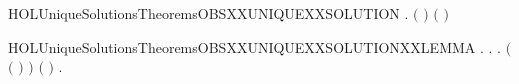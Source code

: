 \newcommand{\HOLUniqueSolutionsTheoremsOBSXXunfoldingXXlemmaFour}{\UseVerbatim{HOLUniqueSolutionsTheoremsOBSXXunfoldingXXlemmaFour}}
\begin{SaveVerbatim}{HOLUniqueSolutionsTheoremsOBSXXUNIQUEXXSOLUTION}
\HOLTokenTurnstile{} \HOLSymConst{\HOLTokenForall{}}  .
         \HOLSymConst{\HOLTokenConj{}}   \HOLSymConst{\HOLTokenConj{}}   \ensuremath{(} \ensuremath{)} \HOLSymConst{\HOLTokenConj{}}   \ensuremath{(} \ensuremath{)} \HOLSymConst{\HOLTokenImp{}}
         
\end{SaveVerbatim}
\newcommand{\HOLUniqueSolutionsTheoremsOBSXXUNIQUEXXSOLUTION}{\UseVerbatim{HOLUniqueSolutionsTheoremsOBSXXUNIQUEXXSOLUTION}}
\begin{SaveVerbatim}{HOLUniqueSolutionsTheoremsOBSXXUNIQUEXXSOLUTIONXXLEMMA}
\HOLTokenTurnstile{} \HOLSymConst{\HOLTokenForall{}}.
         \HOLSymConst{\HOLTokenConj{}}   \HOLSymConst{\HOLTokenImp{}}
       \HOLSymConst{\HOLTokenForall{}}  .
             \HOLTokenTransBegin{}\HOLTokenTransEnd {} \HOLSymConst{\HOLTokenImp{}}
           \HOLSymConst{\HOLTokenExists{}}.
                 \HOLSymConst{\HOLTokenConj{}} \ensuremath{(}\ensuremath{(} \HOLSymConst{\ensuremath{=}} \HOLConst{\ensuremath{\tau}}\ensuremath{)} \HOLSymConst{\HOLTokenImp{}}  \ensuremath{)} \HOLSymConst{\HOLTokenConj{}} \ensuremath{(} \HOLSymConst{\ensuremath{=}}  \ensuremath{)} \HOLSymConst{\HOLTokenConj{}}
               \HOLSymConst{\HOLTokenForall{}}.   \HOLTokenTransBegin{}\HOLTokenTransEnd {} 
\end{SaveVerbatim}
\newcommand{\HOLUniqueSolutionsTheoremsOBSXXUNIQUEXXSOLUTIONXXLEMMA}{\UseVerbatim{HOLUniqueSolutionsTheoremsOBSXXUNIQUEXXSOLUTIONXXLEMMA}}
